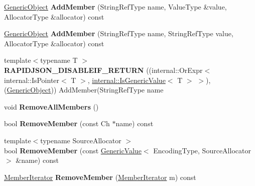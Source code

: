 \begin{DoxyCompactItemize}
\item 
\mbox{\label{class_generic_object_a011a0dd06baf841e3f6e21a3c95db3c1}} 
\hyperlink{class_generic_object}{Generic\+Object} {\bfseries Add\+Member} (String\+Ref\+Type name, Value\+Type \&value, Allocator\+Type \&allocator) const
\item 
\mbox{\label{class_generic_object_a3af43681aea03c4313d689bcbf5e3363}} 
\hyperlink{class_generic_object}{Generic\+Object} {\bfseries Add\+Member} (String\+Ref\+Type name, String\+Ref\+Type value, Allocator\+Type \&allocator) const
\item 
\mbox{\label{class_generic_object_af361a4b677882964789201fc605541d0}} 
{\footnotesize template$<$typename T $>$ }\\{\bfseries R\+A\+P\+I\+D\+J\+S\+O\+N\+\_\+\+D\+I\+S\+A\+B\+L\+E\+I\+F\+\_\+\+R\+E\+T\+U\+RN} ((internal\+::\+Or\+Expr$<$ internal\+::\+Is\+Pointer$<$ T $>$, \hyperlink{structinternal_1_1_is_generic_value}{internal\+::\+Is\+Generic\+Value}$<$ T $>$ $>$),(\hyperlink{class_generic_object}{Generic\+Object})) Add\+Member(String\+Ref\+Type name
\item 
\mbox{\label{class_generic_object_a129ce3843a6658e620a7f740d9f44ee1}} 
void {\bfseries Remove\+All\+Members} ()
\item 
\mbox{\label{class_generic_object_aebeda9c2cac6afd56dda55caaf2c4a0c}} 
bool {\bfseries Remove\+Member} (const Ch $\ast$name) const
\item 
\mbox{\label{class_generic_object_a8e29dc07b992e71e35dd93a57f95842c}} 
{\footnotesize template$<$typename Source\+Allocator $>$ }\\bool {\bfseries Remove\+Member} (const \hyperlink{class_generic_value}{Generic\+Value}$<$ Encoding\+Type, Source\+Allocator $>$ \&name) const
\item 
\mbox{\label{class_generic_object_a006f76a33dada85c9d13e069cc43623d}} 
\hyperlink{class_generic_member_iterator}{Member\+Iterator} {\bfseries Remove\+Member} (\hyperlink{class_generic_member_iterator}{Member\+Iterator} m) const
\item 
\mbox{\label{class_generic_object_a29ad0490a4a088d57df7a9884f979a82}} 

\end{DoxyCompactItemize}
